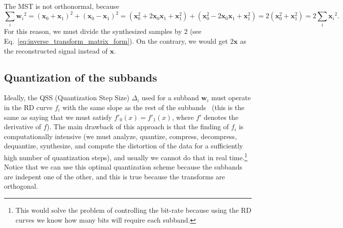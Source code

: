 The MST is not orthonormal, because
\begin{equation}
  \sum_i {{\mathbf w}_i}^2 =
  ({\mathbf x}_0 + {\mathbf x}_1)^2 + ({\mathbf x}_0 - {\mathbf x}_1)^2 =
  ({\mathbf x}_0^2 + 2{\mathbf x}_0{\mathbf x}_1+{\mathbf x}_1^2) + ({\mathbf x}_0^2-2{\mathbf x_0}{\mathbf x}_1+{\mathbf x}_1^2) =
  2({\mathbf x}_0^2+{\mathbf x}_1^2) =
  2\sum_i {{\mathbf x}_i}^2.
  \label{eq:No_Parseval}
\end{equation}
For this reason, we must divide the synthesized samples by $2$ (see
Eq.~\eqref{eq:inverse_transform_matrix_form}). On the contrary, we
would get $2{\mathbf x}$ as the reconstructed signal instead of
${\mathbf x}$.

\subsection{Quantization of the subbands}
\label{sec:quantization_subbands_spatial}

Ideally, the QSS (Quantization Step Size) $\Delta_i$ used for a
subband ${\mathbf w}_i$ must operate in the RD curve $f_i$ with the
same slope as the rest of the
subbands~\cite{vetterli2014foundations,sayood2017introduction} (this
is the same as saying that we must satisfy $f'_0(x)=f'_1(x)$, where
$f'$ denotes the derivative of $f$). The main drawback of this
approach is that the finding of $f_i$ is computationally intensive (we
must analyze, quantize, compress, decompress, dequantize, synthesize,
and compute the distortion of the data for a sufficiently high number
of quantization steps), and usually we cannot do that in real
time.\footnote{This would solve the problem of controlling the
  bit-rate because using the RD curves we know how many bits will
  require each subband.} Notice that we can use this optimal
quantization scheme because the subbands are indepent one of the
other, and this is true because the transforms are orthogonal.

\begin{comment}
  An approximation to this could be to suppose that the RD curves of
  the subbands resulting from the analysis of our current
  piece\footnote{Remember, two samples of a stereo frame in our case
    because we are removing the spatial redundancy.} of data are
  similar to some the curves of previous pieces, that has already been
  compressed and transmitted, and therefore, we can compute also the
  distortion. Using this information, we can estimate a RD curve for
  the current piece and estimate the ``optimal'' QSSs. This procedure
  is much faster than the procedure described in the previous paragraph, but it
  may still be time consuming.
\end{comment}

